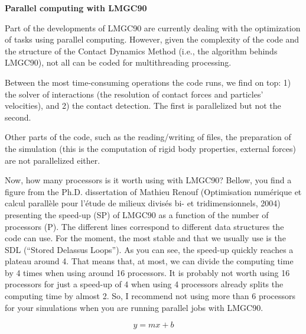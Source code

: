 \documentclass[12pt]{article}
\begin{document}
\begin{center}
  \textbf{\Large Parallel computing with LMGC90}\\
\end{center}

Part of the developments of LMGC90 are currently dealing with the optimization of tasks using parallel computing. However, given the complexity of the code and the structure of the Contact Dynamics Method (i.e., the algorithm behinds LMGC90), not all can be coded for multithreading processing. 

Between the most time-consuming operations the code runs, we find on top: 1) the solver of interactions (the resolution of contact forces and particles’ velocities), and 2) the contact detection. The first is parallelized but not the second.

Other parts of the code, such as the reading/writing of files, the preparation of the simulation (this is the computation of rigid body properties, external forces) are not parallelized either. 

Now, how many processors is it worth using with LMGC90? Bellow, you find a figure from the Ph.D. dissertation of Mathieu Renouf (Optimisation numérique et calcul parallèle pour l’étude de milieux divisés bi- et tridimensionnels, 2004) presenting the speed-up (SP) of LMGC90 as a function of the number of processors (P). The different lines correspond to different data structures the code can use. For the moment, the most stable and that we usually use is the SDL (“Stored Delassus Loops”). As you can see, the speed-up quickly reaches a plateau around 4. That means that, at most, we can divide the computing time by 4 times when using around 16 processors. It is probably not worth using 16 processors for just a speed-up of 4 when using 4 processors already splits the computing time by almost 2. So, I recommend not using more than 6 processors for your simulations when you are running parallel jobs with LMGC90. 

\begin{equation}
y = mx + b
\end{equation}
\end{document}
